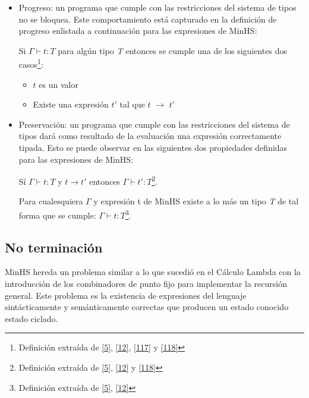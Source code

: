         \begin{itemize}
            \item Progreso: un programa que cumple con las restricciones del sistema de tipos no se bloquea. Este comportamiento está capturado en la definición de progreso enlistada a continuación para las expresiones de \textsf{MinHS}:
             
             \begin{definition}
                Si $\Gamma \vdash t : \textit{T}$ para algún tipo \textit{T} entonces se cumple una de los siguientes dos casos\footnote{Definición extraída de  \hyperlink{5}{[5]},  \hyperlink{12}{[12]}, \hyperlink{117}{[117]} y  \hyperlink{118}{[118]}}:
                \begin{itemize}
			\item $t$ es un valor 
                	\item Existe una expresión $t'$ tal que $t$ $\to$ $t'$
		   \end{itemize}
             \end{definition}

\bigskip
            \item Preservación: un programa que cumple con las restricciones del sistema de tipos dará como resultado de la evaluación una expresión correctamente tipada. Esto se puede observar en las siguientes dos propiedades definidas para las expresiones de \textsf{MinHS}:
                                    
                     \begin{definition}
                        Sí $\Gamma \vdash t : \textit{T}$ y $t \to t'$ entonces $\Gamma \vdash t' : \textit{T}$\footnote{Definición extraída de  \hyperlink{5}{[5]},  \hyperlink{12}{[12]}  y \hyperlink{118}{[118]}}.
                    \end{definition}

                    \begin{definition}
                        Para cualesquiera $\Gamma$ y expresión t de \textsf{MinHS} existe a lo más un tipo \textit{T} de tal forma que se cumple: $\Gamma \vdash t : \textit{T}$\footnote{Definición extraída de \hyperlink{5}{[5]},  \hyperlink{12}{[12]}}.
                    \end{definition}

        \end{itemize}

    \subsection{No terminación}
        \textsf{MinHS} hereda un problema similar a lo que sucedió en el Cálculo Lambda con la introducción de los combinadores de punto fijo para implementar la recursión general. Este problema es la existencia de expresiones del lenguaje sintácticamente y semánticamente correctas que producen un estado conocido estado ciclado.

